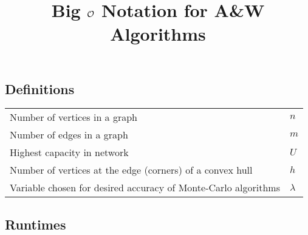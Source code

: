 \documentclass[a4paper,10pt]{article}
\title{\vspace*{-2cm}Big \(\mathcal{O}\) Notation for A\&W Algorithms}
\date{}
\begin{document}
    \maketitle
    \renewcommand{\arraystretch}{1.25}
    \subsection*{Definitions}
    \begin{center}
        \begin{tabularx}{\textwidth}{l >{\raggedleft\arraybackslash}X}
            \toprule
            Number of vertices in a graph & \(n\) \\
            Number of edges in a graph & \(m\) \\
            Highest capacity in network & \(U\) \\
            Number of vertices at the edge (corners) of a convex hull & \(h\) \\
            Variable chosen for desired accuracy of Monte-Carlo algorithms & \(\lambda\) \\
            \bottomrule
        \end{tabularx}
    \end{center}

    \subsection*{Runtimes}
\end{document}
